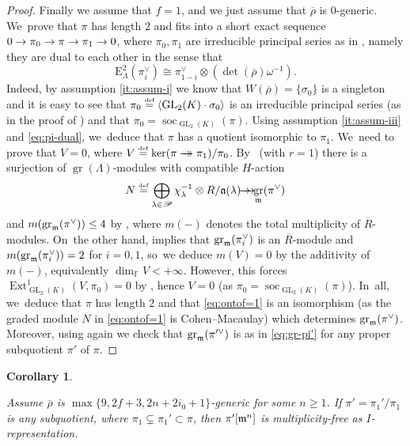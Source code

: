 \documentclass[JEP,XML,SOM,Unicode,NoFloatCountersInSection, NoEqCountersInSection,published]{cedram}
\newcommand{\onto}{\mathchoice{\to\hspace*{-5mm}\to}{\mathrel{\hbox{$\to\hspace*{-2.85mm}\to$}}}{\to\hspace*{-3mm}\to}{\to\hspace*{-3mm}\to}}
\newcommand{\defeq}{\stackrel{\textrm{\tiny{\upshape{def}}}}{=}}
\newcommand{\F}{\mathbb{F}}
\newcommand{\EE}{\mathrm{E}}
\newcommand{\fa}{\mathfrak{a}}
\newcommand{\brho}{\overline{\rho}}
\DeclareMathOperator{\Ext}{Ext}
\DeclareMathOperator{\GL}{GL}
\DeclareMathOperator{\gr}{gr}
\DeclareMathOperator{\soc}{soc}
\theoremstyle{plain}
\newtheorem{cor}[prop]{Corollary}
\theoremstyle{definition}
\begin{document}
\begin{proof}
Finally we assume that $f=1$, and we just assume that $\brho$ is $0$-generic. We~prove that $\pi$ has length $2$ and fits into a short exact sequence $0\to \pi_0\to \pi\to \pi_1\rightarrow0$, where $\pi_0,\pi_1$ are irreducible principal series as in \cite[Cor.\,3.92]{BHHMS2}, namely they are dual to each other in the sense that
\begin{equation}\label{eq:pi-dual}
\EE^{2}_{\Lambda}(\pi_i^{\vee})\cong\pi_{1-i}^{\vee}\otimes(\det(\brho)\omega^{-1}).
\end{equation}
Indeed, by assumption \eqref{it:assum-i} we know that $W(\brho)=\{\sigma_0\}$ is a singleton and it is easy to see that $\pi_0\defeq\langle \GL_2(K)\cdot \sigma_0\rangle$ is an irreducible principal series (as in the proof of \cite[Cor.\,3.92]{BHHMS2}) and that $\pi_0=\soc_{\GL_2(K)}(\pi)$.
Using assumption \eqref{it:assum-iii} and \eqref{eq:pi-dual}, we~deduce that $\pi$ has a quotient isomorphic to $\pi_1$. We~need to prove that $V=0$, where $V\defeq \ker(\pi\onto \pi_1)/\pi_0$. By~\cite[Th.\,3.67]{BHHMS2} (with $r=1$) there is a surjection of $\gr(\Lambda)$-modules with compatible $H$-action
\begin{equation}\label{eq:ontof=1}
N\defeq\bigoplus_{\lambda\in\mathscr{P}}\chi_{\lambda}^{-1} \otimes R/\fa(\lambda)\onto \gr_{\m}(\pi^\vee)
\end{equation}
and $m(\gr_{\m}(\pi^{\vee}))\leq 4$ by \cite[Cor.\,3.71]{BHHMS2}, where $m(-)$ denotes the total multiplicity of $\overline{R}$-modules. On~the other hand, \cite[Prop.\,3.76(ii)]{BHHMS2} implies that $\gr_{\m}(\pi_i^{\vee})$ is an $\overline{R}$-module and $m(\gr_{\m}(\pi_i^{\vee}))=2$ for $i=0,1$, so~we deduce $m(V)=0$ by the additivity of $m(-)$, equivalently $\dim_{\F}V<+\infty$.
However, this forces $\Ext^1_{\GL_2(K)}(V,\pi_0)=0$ by \cite[Lem.\,4.3.9, Prop.~4.3.32(1)]{emerton-ordII}, hence $V=0$ (as $\pi_0=\soc_{\GL_2(K)}(\pi)$). In~all, we~deduce that $\pi$ has length $2$ and that \eqref{eq:ontof=1} is an isomorphism (as the graded module $N$ in \eqref{eq:ontof=1} is Cohen--Macaulay) which determines $\gr_{\m}(\pi^{\vee})$.
Moreover, using \cite[Prop.\,3.76(ii)]{BHHMS2} again we check that $\gr_{\m}(\pi'^{\vee})$ is as in \eqref{eq:gr-pi'} for any proper subquotient $\pi'$ of $\pi$.
\end{proof}

\begin{cor}\label{cor:pi2-mn-mult-free}

Assume $\brho$ is $\max\{9,2f+3,2n+2i_0+1\}$-generic for some $n\geq 1$.
If $\pi' = \pi_1'/\pi_1$ is any subquotient, where $\pi_1 \subsetneq \pi_1' \subset \pi$, then $\pi'[\mathfrak{m}^n]$ is multiplicity-free as $I$-representation.
\end{cor}
\end{document}
